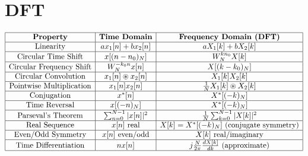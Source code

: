 \documentclass{AnantDocumentation}
\begin{document}
\section{DFT}
\[
\begin{array}{|c|c|c|}
\hline
\textbf{Property} & \textbf{Time Domain} & \textbf{Frequency Domain (DFT)} \\
\hline
\text{Linearity} & a x_1[n] + b x_2[n] & a X_1[k] + b X_2[k] \\
\hline
\text{Circular Time Shift} & x[(n - n_0)_N] & W_N^{kn_0} X[k] \\
\hline
\text{Circular Frequency Shift} & W_N^{-k_0 n} x[n] & X[(k - k_0)_N] \\
\hline
\text{Circular Convolution} & x_1[n] \circledast x_2[n] & X_1[k] X_2[k] \\
\hline
\text{Pointwise Multiplication} & x_1[n] x_2[n] & \frac{1}{N} X_1[k] \circledast X_2[k] \\
\hline
\text{Conjugation} & x^*[n] & X^*[(-k)_N] \\
\hline
\text{Time Reversal} & x[(-n)_N] & X^*[(-k)_N] \\
\hline
\text{Parseval’s Theorem} & \sum_{n=0}^{N-1} |x[n]|^2 & \frac{1}{N} \sum_{k=0}^{N-1} |X[k]|^2 \\
\hline
\text{Real Sequence} & x[n]\text{ real} & X[k] = X^*[(-k)_N] \ (\text{conjugate symmetry}) \\
\hline
\text{Even/Odd Symmetry} & x[n]\text{ even/odd} & X[k]\text{ real/imaginary} \\
\hline
\text{Time Differentiation} & n x[n] & j\frac{N}{2\pi}\frac{d X[k]}{dk} \text{ (approximate)} \\
\hline
\end{array}
\]
\end{document}
